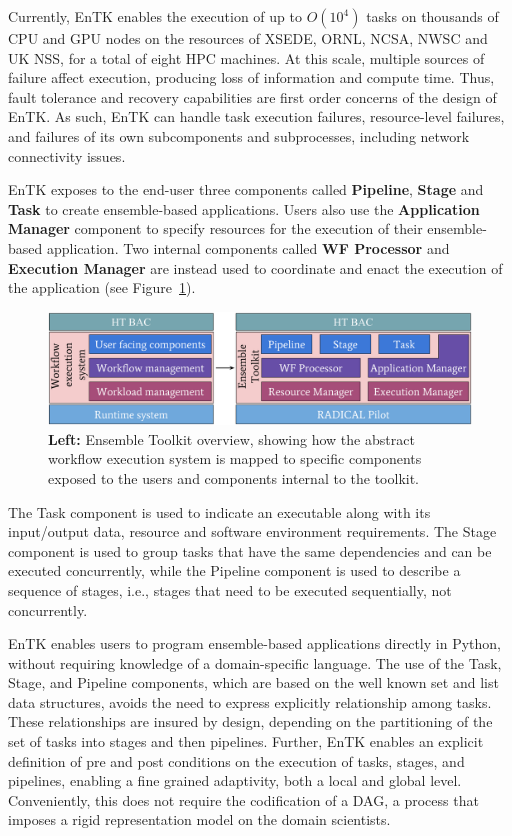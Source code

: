 Currently, EnTK enables the execution of up to \(O(10^4)\) tasks on thousands
of CPU and GPU nodes on the resources of XSEDE, ORNL, NCSA, NWSC and UK NSS,
for a total of eight HPC machines. At this scale, multiple sources of failure
affect execution, producing loss of information and compute time. Thus, fault
tolerance and recovery capabilities are first order concerns of the design of
EnTK\@. As such, EnTK can handle task execution failures, resource-level
failures, and failures of its own subcomponents and subprocesses, including
network connectivity issues.

EnTK exposes to the end-user three components called \textbf{Pipeline},
\textbf{Stage} and \textbf{Task} to create ensemble-based applications. Users
also use the \textbf{Application Manager} component to specify resources for
the execution of their ensemble-based application. Two internal components
called \textbf{WF Processor} and \textbf{Execution Manager} are instead used
to coordinate and enact the execution of the application (see
Figure~\ref{fig:entk_arch}).

\begin{figure}
  \centering
  \includegraphics[width=\columnwidth]{FIGURES/entk_overview.pdf}
  \caption{\textbf{Left:} Ensemble Toolkit overview, showing how the abstract
           workflow execution system is mapped to specific components exposed
           to the users and components internal to the
           toolkit.}\label{fig:entk_arch}
\end{figure}

The Task component is used to indicate an executable along with its
input/output data, resource and software environment requirements. The Stage
component is used to group tasks that have the same dependencies and can be
executed concurrently, while the Pipeline component is used to describe a
sequence of stages, i.e., stages that need to be executed sequentially, not
concurrently.

EnTK enables users to program ensemble-based applications directly in Python,
without requiring knowledge of a domain-specific language. The use of the
Task, Stage, and Pipeline components, which are based on the well known set
and list data structures, avoids the need to express explicitly relationship
among tasks. These relationships are insured by design, depending on the
partitioning of the set of tasks into stages and then pipelines. Further,
EnTK enables an explicit definition of pre and post conditions on the
execution of tasks, stages, and pipelines, enabling a fine grained
adaptivity, both a local and global level. Conveniently, this does not
require the codification of a DAG, a process that imposes a rigid
representation model on the domain scientists.


